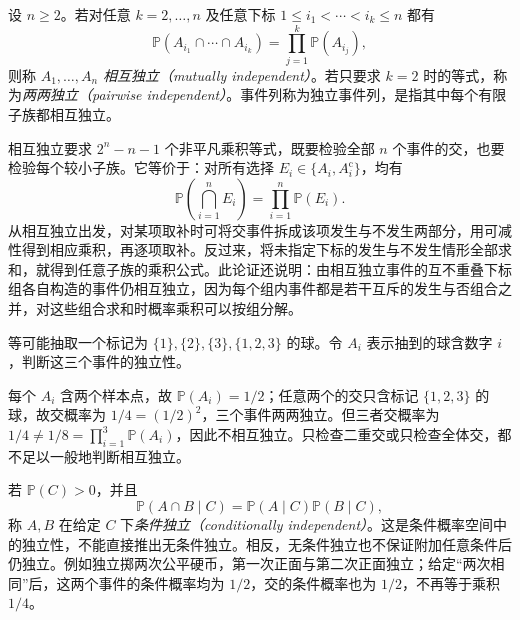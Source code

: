 \begin{definition}
\label{def:study-mutual-independence}
设 $n\ge2$。若对任意 $k=2,\ldots,n$ 及任意下标 $1\le i_1<\cdots<i_k\le n$ 都有
\begin{equation}
 \mathbb P(A_{i_1}\cap\cdots\cap A_{i_k})
 =\prod_{j=1}^{k}\mathbb P(A_{i_j}),
 \label{eq:study-mutual-independence}
\end{equation}
则称 $A_1,\ldots,A_n$ \emph{相互独立（mutually independent）}。若只要求 $k=2$ 时的等式，称为\emph{两两独立（pairwise independent）}。事件列称为独立事件列，是指其中每个有限子族都相互独立。
\end{definition}

相互独立要求 $2^n-n-1$ 个非平凡乘积等式，既要检验全部 $n$ 个事件的交，也要检验每个较小子族。它等价于：对所有选择 $E_i\in\{A_i,A_i^{\mathrm c}\}$，均有
\begin{equation}
 \mathbb P\!\left(\bigcap_{i=1}^{n}E_i\right)
 =\prod_{i=1}^{n}\mathbb P(E_i).
 \label{eq:study-independent-sign-patterns}
\end{equation}
从相互独立出发，对某项取补时可将交事件拆成该项发生与不发生两部分，用可减性得到相应乘积，再逐项取补。反过来，将未指定下标的发生与不发生情形全部求和，就得到任意子族的乘积公式。此论证还说明：由相互独立事件的互不重叠下标组各自构造的事件仍相互独立，因为每个组内事件都是若干互斥的发生与否组合之并，对这些组合求和时概率乘积可以按组分解。

\begin{example}
\label{ex:study-pairwise-not-mutual}
等可能抽取一个标记为 $\{1\},\{2\},\{3\},\{1,2,3\}$ 的球。令 $A_i$ 表示抽到的球含数字 $i$，判断这三个事件的独立性。
\end{example}

\begin{solve}
每个 $A_i$ 含两个样本点，故 $\mathbb P(A_i)=1/2$；任意两个的交只含标记 $\{1,2,3\}$ 的球，故交概率为 $1/4=(1/2)^2$，三个事件两两独立。但三者交概率为 $1/4\ne1/8=\prod_{i=1}^{3}\mathbb P(A_i)$，因此不相互独立。只检查二重交或只检查全体交，都不足以一般地判断相互独立。
\end{solve}

若 $\mathbb P(C)>0$，并且
\[
 \mathbb P(A\cap B\mid C)=\mathbb P(A\mid C)\mathbb P(B\mid C),
\]
称 $A,B$ 在给定 $C$ 下\emph{条件独立（conditionally independent）}。这是条件概率空间中的独立性，不能直接推出无条件独立。相反，无条件独立也不保证附加任意条件后仍独立。例如独立掷两次公平硬币，第一次正面与第二次正面独立；给定“两次相同”后，这两个事件的条件概率均为 $1/2$，交的条件概率也为 $1/2$，不再等于乘积 $1/4$。

